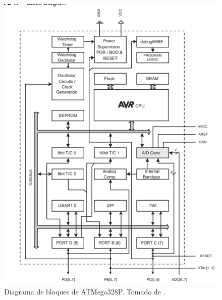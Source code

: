 \begin{figure}[H]
\centering
\includegraphics[width=.8\linewidth]{Imagenes/1.png}
 \caption{Diagrama de bloques de ATMega328P. Tomado de \cite{web}.}
 \label{fig1}
\end{figure}

